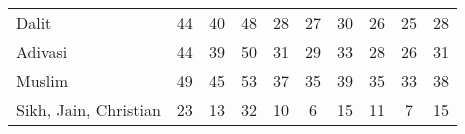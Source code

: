 \begin{tabular}{l*{9}{c}}
Dalit               &          44&          40&          48&          28&          27&          30&          26&          25&          28\\
Adivasi             &          44&          39&          50&          31&          29&          33&          28&          26&          31\\
Muslim              &          49&          45&          53&          37&          35&          39&          35&          33&          38\\
Sikh, Jain, Christian&          23&          13&          32&          10&           6&          15&          11&           7&          15\\
\bottomrule
\end{tabular}
